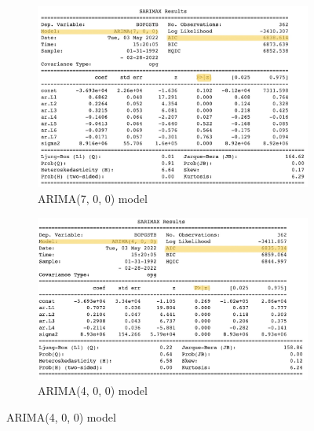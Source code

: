 \documentclass[12pt]{article}
\begin{document}
\begin{center}
        \textbf{\Large{}}
\end{center}

\begin{figure}[H]
	\centering
	\begin{subfigure}{1.0\textwidth}
		\includegraphics[width=\textwidth]{images/arima700.png}
		\caption{ARIMA(7, 0, 0) model}
	\end{subfigure}

    \bigskip
    
	\begin{subfigure}{1.0\textwidth}
		\includegraphics[width=\textwidth]{images/arima400.png}
		\caption{ARIMA(4, 0, 0) model}
	\end{subfigure}
\end{figure}

\pagebreak

\begin{center}
        \textbf{\Large{}}
\end{center}
\end{document}
